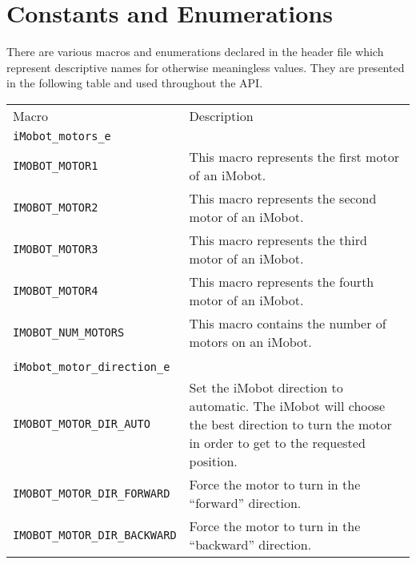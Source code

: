 \section{Constants and Enumerations}
There are various macros and enumerations declared in the header file which 
represent descriptive names for otherwise meaningless values. They are 
presented in the following table and used throughout the API.

\begin{tabular}{lp{3.7in}}
Macro & Description \\
\texttt{iMobot\_motors\_e} & \\\hline
\texttt{IMOBOT\_MOTOR1} & This macro represents the first motor of an iMobot. \\
\texttt{IMOBOT\_MOTOR2} & This macro represents the second motor of an iMobot. \\
\texttt{IMOBOT\_MOTOR3} & This macro represents the third motor of an iMobot. \\
\texttt{IMOBOT\_MOTOR4} & This macro represents the fourth motor of an iMobot. \\
\texttt{IMOBOT\_NUM\_MOTORS} & This macro contains the number of motors on an iMobot. \\
 & \\
\texttt{iMobot\_motor\_direction\_e} & \\\hline
\texttt{IMOBOT\_MOTOR\_DIR\_AUTO} & Set the iMobot direction to automatic. The iMobot will choose the best direction to turn the motor in order to get to the requested position. \\
\texttt{IMOBOT\_MOTOR\_DIR\_FORWARD} & Force the motor to turn in the ``forward'' direction. \\
\texttt{IMOBOT\_MOTOR\_DIR\_BACKWARD} & Force the motor to turn in the ``backward'' direction.
\end{tabular}

\newpage

\pagebreak

\pagebreak

\pagebreak

\pagebreak

\pagebreak

\pagebreak

\pagebreak

\pagebreak

\pagebreak

\pagebreak

\pagebreak

\pagebreak

\pagebreak

\pagebreak

\pagebreak


